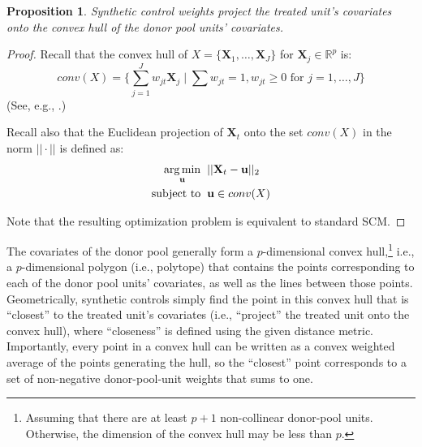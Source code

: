 \documentclass{article}
\newtheorem{proposition}[theorem]{Proposition}
\newcommand{\Xt}{\mathbf{X}_t}
\newcommand{\Xj}{\mathbf{X}_j}
\newcommand{\Rp}{\mathbb{R}^p}
\DeclareMathOperator*{\argmin}{arg\,min}
\begin{document}
\begin{proposition}
\label{prop:scm_is_projection}
Synthetic control weights project the treated unit's covariates onto the convex hull of the donor pool units' covariates.
\end{proposition}
\begin{proof}
    Recall that the convex hull of $X = \{\mathbf{X}_1, \dots, \mathbf{X}_J\}$ for $\Xj \in \Rp$ is:
    \begin{equation*}
        conv(X) = \{\sum_{j=1}^J w_{jt} \Xj \mid \sum w_{jt} = 1, w_{jt} \geq 0 \text{ for } j = 1, \dots, J\}
    \end{equation*}
    (See, e.g., \citet{boyd2004convex}.)
    
    Recall also that the Euclidean projection of $\Xt$ onto the set $conv(X)$ in the norm $||\cdot||$ is defined as:
    \begin{align*}
        \argmin_\mathbf{u} &\hspace{2mm} ||\Xt - \mathbf{u}||_2 \\
        \text{subject to} &\hspace{2mm} \mathbf{u} \in conv(X)
    \end{align*}
    
    Note that the resulting optimization problem is equivalent to standard SCM.
\end{proof}
The covariates of the donor pool generally form a $p$-dimensional convex hull,\footnote{Assuming that there are at least $p+1$ non-collinear donor-pool units. Otherwise, the dimension of the convex hull may be less than $p$.} i.e., a $p$-dimensional polygon (i.e., polytope) that contains the points corresponding to each of the donor pool units' covariates, as well as the lines between those points.
Geometrically, synthetic controls simply find the point in this convex hull that is ``closest'' to the treated unit's covariates (i.e., ``project'' the treated unit onto the convex hull), where ``closeness'' is defined using the given distance metric.
Importantly, every point in a convex hull can be written as a convex weighted average of the points generating the hull, so the ``closest'' point corresponds to a set of non-negative donor-pool-unit weights that sums to one.
\end{document}
